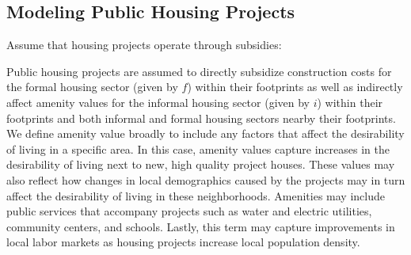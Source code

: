 \documentclass[12pt]{article}
\begin{document}






\subsection{Modeling Public Housing Projects}





Assume that housing projects operate through subsidies:




Public housing projects are assumed to directly subsidize construction costs for the formal housing sector (given by $f$) within their footprints as well as indirectly affect amenity values for the informal housing sector (given by $i$) within their footprints and both informal and formal housing sectors nearby their footprints.  We define amenity value broadly to include any factors that affect the desirability of living in a  specific area.  In this case, amenity values capture increases in the desirability of living next to new, high quality project houses.  These values may also reflect how changes in local demographics caused by the projects may in turn affect the desirability of living in these neighborhoods.  Amenities may include public services that accompany projects such as water and electric utilities, community centers, and schools.  Lastly, this term may capture improvements in local labor markets as housing projects increase local population density.
\end{document}
